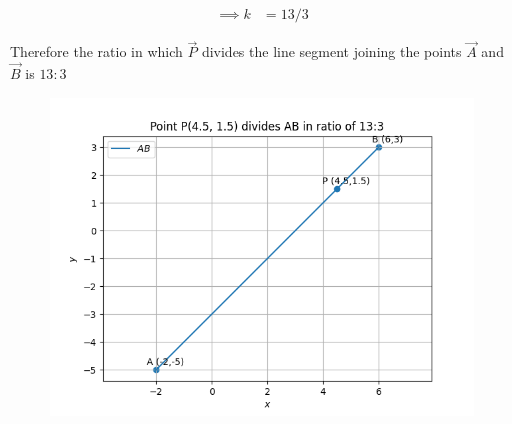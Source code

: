 \documentclass[journal]{IEEEtran}
\begin{document}
\begin{align}
\implies k &= 13/3
\end{align}

Therefore the ratio in which $\vec{P}$ divides the line segment joining the points $\vec{A}$ and $\vec{B}$ is $13:3$\\
\begin{figure}[H]
\begin{center}
\includegraphics[width=0.6\columnwidth]{figs/fig.png}
\end{center}
\label{fig:Fig1}
\end{figure}
\end{document}
